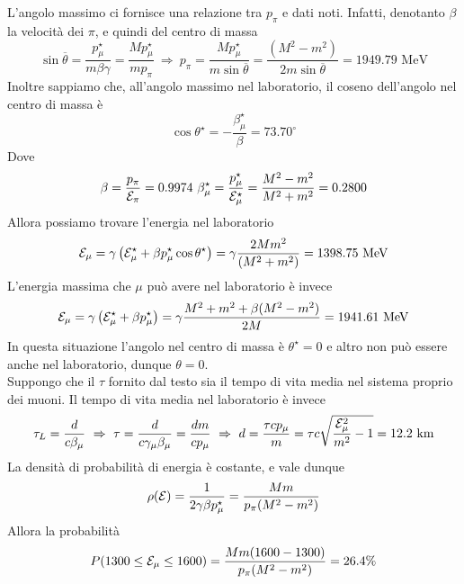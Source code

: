 \documentclass[12pt,twoside,a4]{article}
\begin{document}
\begin{solution}
L'angolo massimo ci fornisce una relazione tra $p_\pi$ e dati noti. Infatti, denotanto $\beta$ la velocità  dei $\pi$, e quindi del centro di massa
$$ \sin\overline{\theta} = \frac{p^\star_\mu}{ m \beta \gamma} = \frac{ M p^\star_\mu}{ m p_\pi}  \  \Rightarrow  \  p_\pi = \frac{ M p^\star_\mu}{ m \sin\overline{\theta}} = 
 \frac{ (M^2 - m^2) }{ 2 m \sin\overline{\theta}} = 1949.79 \mbox{ MeV}$$
Inoltre sappiamo che, all'angolo massimo nel laboratorio, il coseno dell'angolo nel centro di massa è
$$ \cos \theta^\star = - \frac{\beta^\star_\mu}{\beta} = 73.70^\circ$$
Dove
$$ \beta = \frac{p_\pi}{\mathcal{E}_\pi} = 0.9974  \  \beta^\star_\mu =
\frac{p^\star_\mu}{\mathcal{E}^\star_\mu} = \frac{M^2 -m^2}{M^2 + m^2} = 0.2800 $$
Allora possiamo trovare l'energia nel laboratorio
$$ \mathcal{E}_\mu = \gamma \left({ \mathcal{E}_\mu^\star  + \beta p^\star_\mu \cos \theta^\star }\right) = \gamma \frac{2 M m^2}{ (M^2 + m^2)} = 1398.75 \mbox{ MeV}$$
L'energia massima che $\mu$ può avere nel laboratorio è invece
$$\mathcal{E}_\mu = \gamma \left({\mathcal{E}_\mu^\star + \beta p_\mu^\star}\right) = \gamma \frac{M^2 + m^2 + \beta(M^2 -m^2)}{2M} = 1941.61 \mbox{ MeV}$$
In questa situazione l'angolo nel centro di massa è $\theta^\star =0$ e altro non può essere anche nel laboratorio, dunque $\theta = 0$. 
\\
Suppongo che il $\tau$ fornito dal testo sia il tempo di vita media nel sistema proprio dei muoni. Il tempo di vita media nel laboratorio è invece
$$ \tau_L = \frac{d}{c \beta_\mu}  \  \Rightarrow  \  \tau = \frac{d}{c \gamma_\mu  \beta_\mu} = \frac{d  m}{c p_\mu}  \  \Rightarrow  \  d  = \frac{\tau c p_\mu}{m} = \tau c \sqrt{\frac{\mathcal{E}_\mu^2}{m^2} - 1} = 12.2 \mbox{ km}
$$
La densità  di probabilità  di energia è costante, e vale dunque
$$ \rho (\mathcal{E}) = \frac{1}{2  \gamma \beta p^\star_\mu} = \frac{Mm}{ p_\pi (M^2 - m^2) }$$
Allora la probabilità 
$$ P (1300 \leq \mathcal{E}_\mu \leq 1600) = \frac{Mm(1600-1300)}{ p_\pi (M^2 - m^2) } = 26.4 \% $$
\end{solution}
\end{document}

